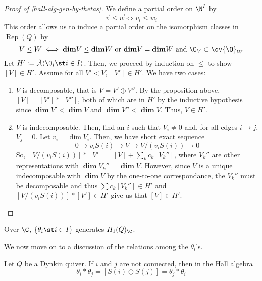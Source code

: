 \documentclass[11pt,leqno,oneside]{amsbook}
\numberwithin{thm}{section}
\newcommand{\Rep}{\operatorname{Rep}} %
\renewcommand{\Q}{Q} %
\newcommand{\grdim}{\boldsymbol{\dim}} %
\newcommand{\A}{\tilde{\mathcal{A}}}
\begin{document}
\begin{proof}[Proof of \ref{hall-alg-gen-by-thetas}]
  We define a partial order on \(\N^I\) by \[
    \vec{v} \leq \vec{w} \iff v_i \leq w_i
  \]
  This order allows us to induce a partial order on the isomorphism
  classes in \(\Rep(\Q)\) by \[
    V \leq W \iff \grdim V \leq \grdim W \text{ or } \grdim V = \grdim
    W \text{ and } \O_V \subset \ov{\O}_W
  \]
  Let \(H' := \A \langle \O_i \st i \in I \rangle\). Then, we proceed
  by induction on \(\leq\) to show \([V] \in H'\). Assume for all \(V'
  < V\), \([V'] \in H'\). We have two cases:
  \begin{enumerate}[label=(\roman*)]
  \item \(V\) is decomposable, that is \(V = V' \oplus V''\). By the
    proposition above, \([V] = [V'] 
    * [V'']\), both of which are in \(H'\) by the inductive
    hypothesis since \(\grdim V' < \grdim V\) and \(\grdim V'' <
    \grdim V\). Thus, \(V \in H'\).
  \item \(V\) is indecomposable. Then, find an \(i\) such that \(V_i
    \neq 0\) and, for all edges \(i \to j\), \(V_j = 0\). Let \(v_i =
    \dim V_i\). Then, we have short exact sequence \[
      0 \to v_i S(i) \to V \to V/(v_i S(i)) \to 0
    \]
    So, \([V/(v_i S(i))]*[V'] = [V] + \sum_k c_k [V_k'']\), where
    \(V_k''\) are other representations with \(\grdim V_k'' = \grdim
    V\). However, since \(V\) is a unique indecomposable with \(\grdim
    V\) by the one-to-one correspondance, the
    \(V_k''\) must be decomposable and thus \(\sum c_k [V_k''] \in
    H'\) and \([V/(v_i S(i))]*[V'] \in H'\) give us that \([V] \in H'\).
  \end{enumerate}
\end{proof}
\begin{cor}
  Over \(\C\), \(\{\theta_i \st i \in I\}\) generates \(H_1(\Q)_\C\).
\end{cor}
We now move on to a discussion of the relations among the
\(\theta_i\)'s.
\begin{prop}
  Let \(\Q\) be a Dynkin quiver. If \(i\) and \(j\) are not connected,
  then in the Hall algebra \[
    \theta_i * \theta_j = [S(i) \oplus S(j)] = \theta_j * \theta_i
  \]
\end{prop}
\end{document}
